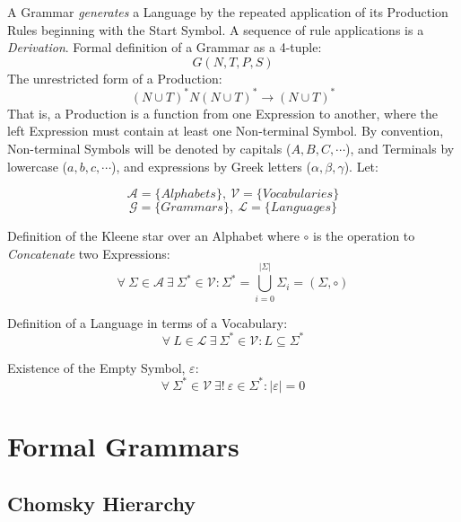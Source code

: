 \documentclass{article}
\begin{document}
A Grammar \emph{generates} a Language by the repeated application of
its Production Rules beginning with the Start Symbol. A sequence of
rule applications is a \emph{Derivation}. Formal definition of a
Grammar as a 4-tuple:
\[
    G(N,T,P,S)
\]
The unrestricted form of a Production:
\[
    (N \cup T)^*N(N \cup T)^* \rightarrow (N \cup T)^*
\]
That is, a Production is a function from one Expression to
another, where the left Expression must contain at least one
Non-terminal Symbol. By convention, Non-terminal Symbols
will be denoted by capitals ($A,B,C,\cdots$), and Terminals by
lowercase ($a,b,c,\cdots$), and expressions by Greek letters
($\alpha,\beta,\gamma$). Let:

\[
    \mathcal{A} = \{ Alphabets \},\: \mathcal{V} = \{ Vocabularies \}
\] \[
    \mathcal{G} = \{ Grammars \},\: \mathcal{L} = \{ Languages \}
\]

    \begin{description}

    \item Definition of the Kleene star over an
      Alphabet where $\circ$ is the operation to \emph{Concatenate} two
      Expressions:
    \[
        \forall \: \Sigma \in \mathcal{A} \:
        \exists \: \Sigma^* \in \mathcal{V}
        : \Sigma^* = \bigcup_{i=0}^{|\Sigma|} \Sigma_i
        = (\Sigma,\circ)
    \]

    \item Definition of a Language in terms of a Vocabulary:
    \[
        \forall \: L \in \mathcal{L} \:
        \exists \: \Sigma^* \in \mathcal{V}
        : L \subseteq \Sigma^*
    \]

    \item Existence of the Empty Symbol, $\varepsilon$:
    \[
        \forall \: \Sigma^* \in \mathcal{V} \:
        \exists ! \: \varepsilon \in \Sigma^*
        : |\varepsilon|=0
    \]

    \end{description}

\section{Formal Grammars}

\subsection{Chomsky Hierarchy}
\end{document}

